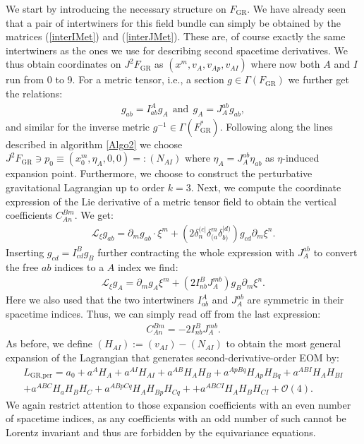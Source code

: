 We start by introducing the necessary structure on $F_{\text{GR}}$. We have already seen that a pair of intertwiners for this field bundle can simply be obtained by the matrices  (\ref{interIMet}) and (\ref{interJMet}). These are, of course exactly the same intertwiners as the ones we use for describing second spacetime derivatives. We thus obtain coordinates on $J^2F_{\text{GR}}$ as $(x^m,v_A,v_{Ap},v_{AI})$ where now both $A$ and $I$ run from 0 to 9. For a metric tensor, i.e., a section $g \in \Gamma(F_{\text{GR}})$ we further get the relations:
\begin{align}
    g_{ab} = I^A _{ab} g_A \ \ \text{and} \ \ g_A = J^{ab}_{A} g_{ab},
\end{align}
and similar for the inverse metric $g^{-1} \in \Gamma(F_{\text{GR}}^{\ast})$.
Following along the lines described in algorithm \ref{Algo2} we choose $J^2F_{\text{GR}} \ni p_0 \equiv (x_0^m,\eta_A,0,0) =: (N_{AI})$ where $\eta_A = J^{ab}_A \eta_{ab}$ as $\eta$-induced expansion point. Furthermore, we choose to construct the perturbative gravitational Lagrangian up to order $k=3$. 
Next, we compute the coordinate expression of the Lie derivative of a metric tensor field to obtain the vertical coefficients $C_{An}^{Bm}$. We get:
\begin{align}
    \mathcal{L}_{\xi} g_{ab} = \partial_m g_{ab} \cdot \xi^m + \left (2 \delta_n^{(c\vert} \delta_{(a}^m \delta_{b)}^{\vert d)} \right ) g_{cd} \partial_m \xi^n.
\end{align}
Inserting $g_{cd} = I^B_{cd} g_B$ further contracting the whole expression with $J^{ab}_A$ to convert the free $ab$ indices to a $A$ index we find:
\begin{align}
    \mathcal{L}_{\xi} g_A = \partial_m g_A \xi^m + \left (2 I^B_{nb}J^{mb}_{A} \right )g_B \partial_m \xi ^n. 
\end{align}
Here we also used that the two intertwiners $I^A_{ab}$ and $J_A^{ab}$ are symmetric in their spacetime indices. Thus, we can simply read off from the last expression:
\begin{align}
    C_{An}^{Bm} = -2 I^B_{nb}J_A^{mb}.
\end{align}
As before, we define $(H_{AI}) := (v_{AI}) - (N_{AI})$ to obtain the most general expansion of the Lagrangian that generates second-derivative-order EOM by:
\begin{align}\label{LGR}
    L_{\text{GR,per}} =  a_0 + a^A H_A + a^{AI}H_{AI} + a^{AB} H_{A}H_{B} + a^{ApBq} H_{Ap}H_{Bq} + a^{ABI} H_{A} H_{BI} \\
    + a^{ABC} H_a H_B H_C + a^{ABpCq} H_{A}H_{Bp}H_{Cq} +
    + a^{ABCI} H_A H_B H_{CI} 
    + \mathcal{O}(4).
\end{align}
We again restrict attention to those expansion coefficients with an even number of spacetime indices, as any coefficients with an odd number of such cannot be Lorentz invariant and thus are forbidden by the equivariance equations.

